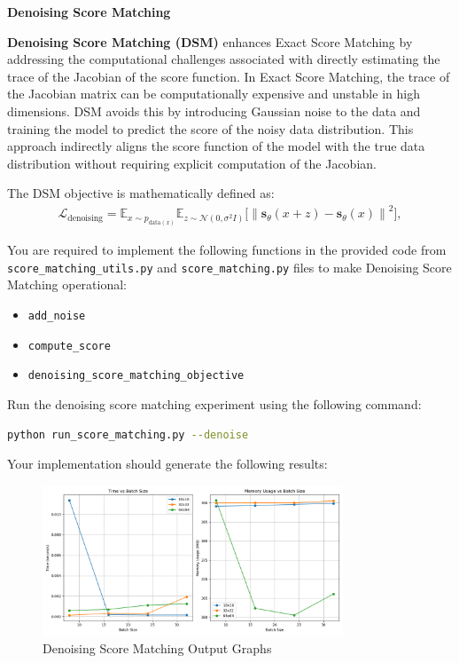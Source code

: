  \textbf{Denoising Score Matching}

\textbf{Denoising Score Matching (DSM)} enhances Exact Score Matching by addressing the computational challenges associated with directly estimating the trace of 
the Jacobian of the score function. In Exact Score Matching, the trace of the Jacobian matrix can be computationally expensive and 
unstable in high dimensions. DSM avoids this by introducing Gaussian noise to the data and training the model to predict the score of 
the noisy data distribution. This approach indirectly aligns the score function of the model with the true data distribution without 
requiring explicit computation of the Jacobian.

The DSM objective is mathematically defined as:
\begin{align}    
    \mathcal{L}_{\text{denoising}} = \mathbb{E}_{x \sim p_{\text{data}(x)}} \mathbb{E}_{z \sim \mathcal{N}(0, \sigma^2 I)} \Big[ \left\| \mathbf{s}_\theta(x + z) - \mathbf{s}_\theta(x) \right\|^2 \Big],
\end{align}


You are required to implement the following functions in the provided code from \texttt{score\_matching\_utils.py} and \texttt{score\_matching.py} files to make Denoising Score Matching operational:

\begin{itemize}
    \item \texttt{add\_noise}
    \item \texttt{compute\_score}
    \item \texttt{denoising\_score\_matching\_objective}
\end{itemize}

Run the denoising score matching experiment using the following command:
\begin{lstlisting}[language=bash]
    python run_score_matching.py --denoise
\end{lstlisting}

Your implementation should generate the following results:
\begin{figure}[H]
    \centering
    \includegraphics[width=0.8\textwidth]{./figures/denoising_results}
    \caption{Denoising Score Matching Output Graphs}
\end{figure}